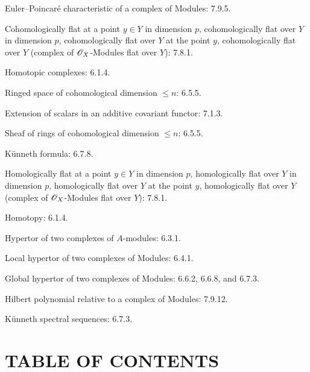 \begin{flushleft}
Euler--Poincaré characteristic of a complex of Modules: 7.9.5.

\medskip
Cohomologically flat at a point $y\in Y$ in dimension $p$,
cohomologically flat over $Y$ in dimension $p$, cohomologically flat over
$Y$ at the point $y$, cohomologically flat over $Y$ (complex of
$\mathscr{O}_X$-Modules flat over $Y$): 7.8.1.

\medskip
Homotopic complexes: 6.1.4.

\medskip
Ringed space of cohomological dimension $\leq n$: 6.5.5.

\medskip
Extension of scalars in an additive covariant functor: 7.1.3.

\medskip
Sheaf of rings of cohomological dimension $\leq n$: 6.5.5.

\medskip
Künneth formula: 6.7.8.

\medskip
Homologically flat at a point $y\in Y$ in dimension $p$, homologically flat
over $Y$ in dimension $p$, homologically flat over $Y$ at the point $y$,
homologically flat over $Y$ (complex of $\mathscr{O}_X$-Modules flat over $Y$):
7.8.1.

\medskip
Homotopy: 6.1.4.

\medskip
Hypertor of two complexes of $A$-modules: 6.3.1.

\medskip
Local hypertor of two complexes of Modules: 6.4.1.

\medskip
Global hypertor of two complexes of Modules: 6.6.2, 6.6.8, and 6.7.3.

\medskip
Hilbert polynomial relative to a complex of Modules: 7.9.12.

\medskip
Künneth spectral sequences: 6.7.3.
\end{flushleft}

\clearpage
{}
\section*{TABLE OF CONTENTS}

